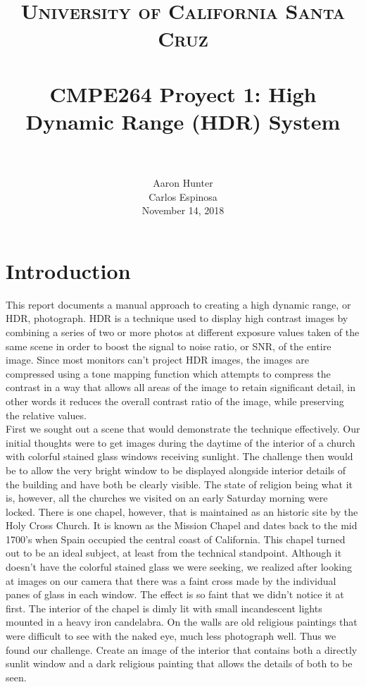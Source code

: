 \documentclass[a4paper]{article}
\title{
		\vspace{-0.6in} 	
		\usefont{OT1}{bch}{b}{n}
		\normalfont \normalsize \textsc{University of California Santa Cruz} \\ [10pt]
		\horrule{0.5pt} \\[0.4cm]
		\huge CMPE264 Proyect 1: High Dynamic Range (HDR) System \\
		\horrule{2pt} \\[0.5cm]
}
\author{
		\normalfont 								
        Aaron Hunter\\  Carlos Espinosa\\[-3pt]		\normalsize
        November 14, 2018
}
\date{}
\begin{document}
\maketitle
\section*{Introduction}
This report documents a manual approach to creating a high dynamic range, or HDR, photograph.  HDR is a technique used to display  high contrast images by combining a series of two or more photos  at different exposure values taken of the same scene in order to boost the signal to noise ratio, or SNR, of the entire image.  Since most monitors can't project HDR images, the images are compressed using a tone mapping function which attempts to compress the contrast in a way that allows all areas of the image to retain significant detail, in other words it reduces the overall contrast ratio of the image, while preserving the relative values. \\

First we sought out a scene that would demonstrate the technique effectively.  Our initial thoughts were to get images during the daytime of the interior of a church with colorful stained glass windows receiving sunlight.  The challenge then would be to allow the very bright window to be displayed alongside interior details of the building and have both be clearly visible.  The state of religion being what it is, however, all the churches we visited on an early Saturday morning were locked.  There is one chapel, however, that is maintained as an historic site by the Holy Cross Church.  It is known as the Mission Chapel and dates back to the mid 1700's when Spain occupied the central coast of California.  This chapel turned out to be an ideal subject, at least from the technical standpoint.  Although it doesn't have the colorful stained glass we were seeking, we realized after looking at images on our camera that there was a faint cross made by the individual panes of glass in each window.  The effect is so faint that we didn't notice it at first.  The interior of the chapel is dimly lit with small incandescent lights mounted in a heavy iron candelabra. On the walls are old religious paintings that were difficult to see with the naked eye, much less photograph well.  Thus we found our challenge.  Create an image of the interior that contains both a directly sunlit window and a dark religious painting that allows the details of both to be seen. 
\end{document}
